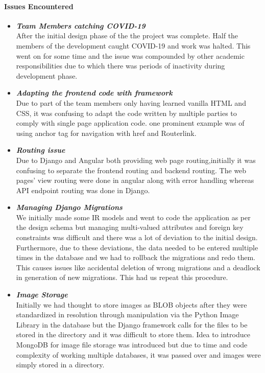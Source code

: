 \documentclass[12pt]{article}
\begin{document}
\paragraph{Issues Encountered}
\begin{itemize}
    \item \textit{\textbf{Team Members catching COVID-19}}\\
        After the initial design phase of the the project was complete. Half the members of the development caught COVID-19 and work was halted. This went on for some time and the issue was compounded by other academic responsibilities due to which there was periods of inactivity during development phase.
    \item \textit{\textbf{Adapting the frontend code with framework}}\\
        Due to part of the team members only having learned vanilla HTML and CSS, it was confusing to adapt the code written by multiple parties to comply with single page application code. 
        one prominent example was of using anchor tag for navigation with href and Routerlink.
    \item \textit{\textbf{Routing issue}}\\
    Due to Django and Angular both providing web page routing,initially it was confusing to separate the frontend routing and backend routing. The web pages' view routing were done in angular along with error handling whereas API endpoint routing was done in Django.
    \item  \textit{\textbf{Managing Django Migrations}}\\
    We initially made some IR models and went to code the application as per the design schema but managing multi-valued attributes and foreign key constraints was difficult and there was a lot of deviation to the initial design. Furthermore, due to these deviations, 
    the data needed to be entered multiple times in the database and we had to rollback the migrations and redo them. This causes issues like accidental deletion of wrong migrations and a deadlock in generation of new migrations. This had us repeat this procedure.
    \item  \textit{\textbf{Image Storage}}\\
        Initially we had thought to store images as BLOB objects after they were standardized in resolution through manipulation via the Python Image Library in the database but the Django framework calls for the files to be stored in the directory and it was difficult to store them. Idea to introduce MongoDB for image file storage was introduced but due to time and code complexity of working multiple databases, it was passed over and images were simply stored in a directory.

\end{itemize}
\end{document}
